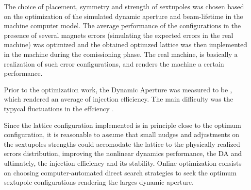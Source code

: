     The choice of placement, symmetry and strength of sextupoles was chosen based on the optimization of the simulated dynamic aperture and beam-lifetime in the machine computer model. The average performance of the configurations in the presence of several magnets errors (simulating the expected errors in the real machine)  was optimized and the obtained optimzed lattice was then implemented in the machine during the comissioning phase. The real machine, is basically a realization of such error configurations, and renders the machine a certain performance.

    Prior to the optimization work, the Dynamic Aperture was measured to be , which rendered an average of  injection efficiency. The main difficulty was the typycal fluctuations in the effciency .

    Since the lattice configuration implemented is in principle close to the optimum configuration, it is reasonable to assume that small nudges and adjustments on the sextupoles strengths could accomodate the lattice to the physically realized errors distribution, improving the nonlinear dynamics performance, the DA and ultimately, the injection efficiency and its stability. Online optimization consists on choosing computer-automated direct search strategies to seek the optimum sextupole configurations rendering the larges dynamic aperture.

